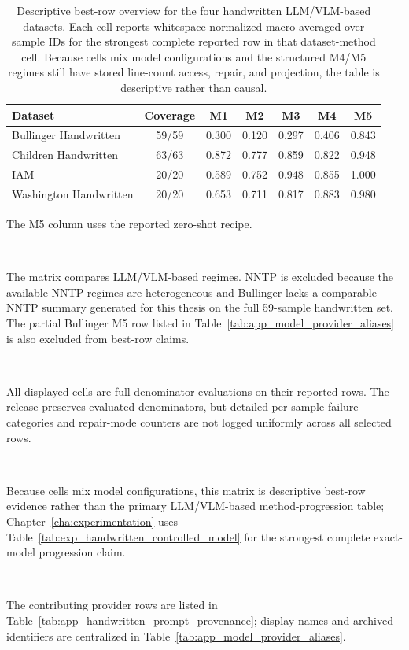 \begin{table}[t]
  \centering
  \caption{Descriptive best-row overview for the four handwritten LLM/VLM-based datasets. Each cell reports whitespace-normalized \LANormCombined{} macro-averaged over sample IDs for the strongest complete reported row in that dataset-method cell. Because cells mix model configurations and the structured M4/M5 regimes still have stored line-count access, repair, and projection, the table is descriptive rather than causal.}
  \label{tab:exp_handwritten_prompt_matrix}
  \footnotesize
  \begin{tabular}{@{}l c c c c c c@{}}
    \toprule
    \textbf{Dataset} & \textbf{Coverage} & \textbf{M1} & \textbf{M2} & \textbf{M3} & \textbf{M4} & \textbf{M5} \\
    \midrule
    Bullinger Handwritten & 59/59 & 0.300 & 0.120 & 0.297 & 0.406 & 0.843 \\
    Children Handwritten & 63/63 & 0.872 & 0.777 & 0.859 & 0.822 & 0.948 \\
    IAM & 20/20 & 0.589 & 0.752 & 0.948 & 0.855 & 1.000 \\
    Washington Handwritten & 20/20 & 0.653 & 0.711 & 0.817 & 0.883 & 0.980 \\
    \bottomrule
  \end{tabular}
  \vspace{0.35em}

  \parbox{0.82\linewidth}{\footnotesize\raggedright The M5 column uses the reported zero-shot \contextHundred{} recipe.}\\[0.35em]
  \parbox{0.82\linewidth}{\footnotesize\raggedright The matrix compares LLM/VLM-based regimes. NNTP is excluded because the available NNTP regimes are heterogeneous and Bullinger lacks a comparable NNTP summary generated for this thesis on the full 59-sample handwritten set. The partial Bullinger \QwenThirtyTwoShort{} M5 row listed in Table~\ref{tab:app_model_provider_aliases} is also excluded from best-row claims.}\\[0.35em]
  \parbox{0.82\linewidth}{\footnotesize\raggedright All displayed cells are full-denominator evaluations on their reported rows. The release preserves evaluated denominators, but detailed per-sample failure categories and repair-mode counters are not logged uniformly across all selected rows.}\\[0.35em]
  \parbox{0.82\linewidth}{\footnotesize\raggedright Because cells mix model configurations, this matrix is descriptive best-row evidence rather than the primary LLM/VLM-based method-progression table; Chapter~\ref{cha:experimentation} uses Table~\ref{tab:exp_handwritten_controlled_model} for the strongest complete exact-model progression claim.}\\[0.35em]
  \parbox{0.82\linewidth}{\footnotesize\raggedright The contributing provider rows are listed in Table~\ref{tab:app_handwritten_prompt_provenance}; display names and archived identifiers are centralized in Table~\ref{tab:app_model_provider_aliases}.}
\end{table}


